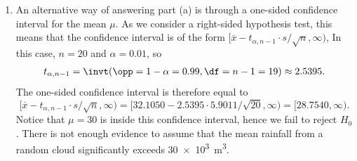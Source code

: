 {\begin{enumerate}
        \item[(e)] An alternative way of answering part (a) is through a one-sided confidence interval for the mean $\mu$.
        As we consider a right-sided hypothesis test, this means that the confidence interval is of the form $[\overline{x} - t_{\alpha,n-1} \cdot s / \sqrt{n}, \infty)$,
        In this case, $n = 20$ and $\alpha = 0.01$, so
        \begin{align*}
            t_{\alpha,n-1} = \invt(\opp=1 - \alpha=0.99, \df=n-1=19) \approx 2.5395.
        \end{align*}
        The one-sided confidence interval is therefore equal to
        \[
            [\overline{x} - t_{\alpha,n-1} \cdot s / \sqrt{n}, \infty) = [32.1050 - 2.5395 \cdot 5.9011 / \sqrt{20}, \infty) = [28.7540,\infty).
        \]
        Notice that $\mu = 30$ is inside this confidence interval, hence we fail to reject $H_0$.
        There is not enough evidence to assume that the mean rainfall from a random cloud
        significantly exceeds \SI{30e3}{\cubic\metre}.
    \end{enumerate}
}

